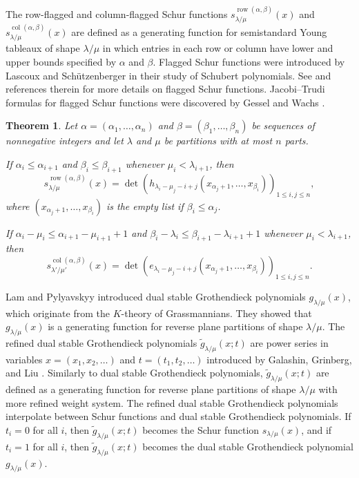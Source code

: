 \documentclass[12pt]{amsart}
\numberwithin{equation}{section}
\newtheorem{thm}{Theorem}[section]
\theoremstyle{definition}
\newcommand\wg{\widetilde{g}}
\newcommand\col{\operatorname{col}}
\newcommand\row{\operatorname{row}}
\newcommand\lm{{\lambda/\mu}}
\begin{document}
The row-flagged and column-flagged Schur functions
$s_{\lambda/\mu}^{\row(\alpha,\beta)}(x)$ and
$s_{\lambda/\mu}^{\col(\alpha,\beta)}(x)$ are defined as a generating function
for semistandard Young tableaux of shape $\lm$ in which entries in each row or
column have lower and upper bounds specified by $\alpha$ and $\beta$. Flagged
Schur functions were introduced by Lascoux and Sch\"utzenberger \cite{LS1982p}
in their study of Schubert polynomials. See \cite{Chen2002, Merzon_2015,
  Wachs_1985} and references therein for more details on flagged Schur
functions. Jacobi--Trudi formulas for flagged Schur functions were discovered by
Gessel \cite{Gessel_unpublished} and Wachs \cite{Wachs_1985}.

\begin{thm}\cite[Theorems~3.5 and 3.5*]{Wachs_1985}
\label{thm:wachs}
Let $\alpha=(\alpha_1,\dots,\alpha_n)$ and $\beta=(\beta_1,\dots,\beta_n)$ be
sequences of nonnegative integers and let $\lambda$ and $\mu$ be partitions with
at most $n$ parts.

If $\alpha_i\le \alpha_{i+1}$ and $\beta_i\le \beta_{i+1}$ whenever
$\mu_i<\lambda_{i+1}$, then
\begin{equation}
  \label{eq:wachs1}
s_{\lambda/\mu}^{\row(\alpha,\beta)}(x)  = \det \left(
    h_{\lambda_i-\mu_j-i+j}(x_{\alpha_j+1},\dots, x_{\beta_i})
  \right)_{1\le i,j\le n},
\end{equation}
where $(x_{\alpha_j+1},\dots, x_{\beta_i})$ is the empty list if $\beta_i \leq
\alpha_j$.

If $\alpha_i-\mu_i\le \alpha_{i+1}-\mu_{i+1}+1$ and $\beta_i-\lambda_i\le
\beta_{i+1}-\lambda_{i+1}+1$ whenever $\mu_i<\lambda_{i+1}$, then
\begin{equation}
 \label{eq:wachs2}
s_{\lambda'/\mu'}^{\col(\alpha,\beta)}(x)  = \det \left(
    e_{\lambda_i-\mu_j-i+j}(x_{\alpha_j+1},\dots, x_{\beta_i})
  \right)_{1\le i,j\le n}.
\end{equation}
\end{thm}



Lam and Pylyavskyy \cite{LP2007} introduced dual stable Grothendieck polynomials
$g_{\lm}(x)$, which originate from the $K$-theory of Grassmannians. They showed
that $g_{\lm}(x)$ is a generating function for reverse plane partitions of shape
$\lm$. The refined dual stable Grothendieck polynomials $\wg_{\lm}(x;t)$ are
power series in variables $x=(x_1,x_2,\dots)$ and $t=(t_1,t_2,\dots)$ introduced
by Galashin, Grinberg, and Liu \cite{GGL2016}. Similarly to dual stable
Grothendieck polynomials, $\wg_{\lm}(x;t)$ are defined as a generating function
for reverse plane partitions of shape $\lm$ with more refined weight system. The
refined dual stable Grothendieck polynomials interpolate between Schur functions
and dual stable Grothendieck polynomials. If $t_i=0$ for all $i$, then
$\wg_{\lm}(x;t)$ becomes the Schur function $s_{\lm}(x)$, and if $t_i=1$ for all
$i$, then $\wg_{\lm}(x;t)$ becomes the dual stable Grothendieck polynomial
$g_{\lm}(x)$.
\end{document}
